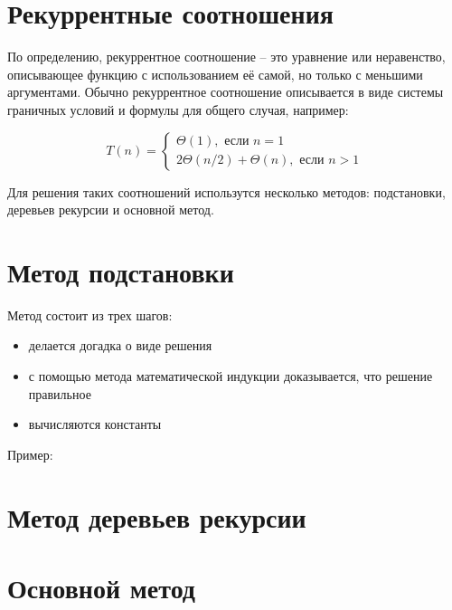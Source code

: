 \documentclass[11pt]{article}
\begin{document}
\section{Рекуррентные соотношения}

По определению, рекуррентное соотношение -- это уравнение или неравенство,
описывающее функцию с использованием её самой, но только с меньшими аргументами.
Обычно рекуррентное соотношение описывается в виде системы граничных условий
и формулы для общего случая, например:

\begin{equation*}
  T(n) = \begin{cases}
    \Theta(1), \text{ если } n = 1 \\
    2\Theta(n/2) + \Theta(n), \text{ если } n > 1
    \end{cases}
\end{equation*}

Для решения таких соотношений использутся несколько методов: подстановки, деревьев
рекурсии и основной метод.

\section{Метод подстановки}

Метод состоит из трех шагов:
\begin{itemize}
\item делается догадка о виде решения
\item с помощью метода математической индукции доказывается, что решение правильное
\item вычисляются константы 
\end{itemize}
Пример:

\section{Метод деревьев рекурсии}

\section{Основной метод}
\end{document}
